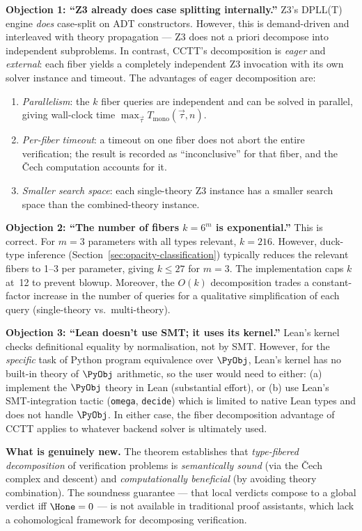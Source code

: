 \begin{remark}
\label{rem:adv-fiber}
\textbf{Objection 1: ``Z3 already does case splitting internally.''}
Z3's DPLL(T) engine \emph{does} case-split on ADT constructors.
However, this is demand-driven and interleaved with theory propagation
— Z3 does not a priori decompose into independent subproblems.  In
contrast, CCTT's decomposition is \emph{eager} and \emph{external}:
each fiber yields a completely independent Z3 invocation with its
own solver instance and timeout.  The advantages of eager
decomposition are:
\begin{enumerate}[label=(\roman*)]
  \item \emph{Parallelism}: the $k$ fiber queries are independent
    and can be solved in parallel, giving wall-clock time
    $\max_{\vec{\tau}} T_{\mathrm{mono}}(\vec{\tau}, n)$.
  \item \emph{Per-fiber timeout}: a timeout on one fiber does not
    abort the entire verification; the result is recorded as
    ``inconclusive'' for that fiber, and the \v{C}ech computation
    accounts for it.
  \item \emph{Smaller search space}: each single-theory Z3 instance
    has a smaller search space than the combined-theory instance.
\end{enumerate}

\textbf{Objection 2: ``The number of fibers $k = 6^m$ is
exponential.''}  This is correct.  For $m = 3$ parameters with all
types relevant, $k = 216$.  However, duck-type inference
(Section~\ref{sec:opacity-classification}) typically reduces the
relevant fibers to 1--3 per parameter, giving $k \leq 27$ for
$m = 3$.  The implementation caps $k$ at~12 to prevent blowup.
Moreover, the $O(k)$ decomposition trades a constant-factor
increase in the number of queries for a qualitative simplification
of each query (single-theory vs.\ multi-theory).

\textbf{Objection 3: ``Lean doesn't use SMT; it uses its kernel.''}
Lean's kernel checks definitional equality by normalisation, not by
SMT.  However, for the \emph{specific} task of Python program
equivalence over $\PyObj$, Lean's kernel has no built-in theory
of $\PyObj$ arithmetic, so the user would need to either:
(a) implement the $\PyObj$ theory in Lean (substantial effort), or
(b) use Lean's SMT-integration tactic (\texttt{omega}, \texttt{decide})
which is limited to native Lean types and does not handle $\PyObj$.
In either case, the fiber decomposition advantage of CCTT applies
to whatever backend solver is ultimately used.

\textbf{What is genuinely new.}
The theorem establishes that \emph{type-fibered decomposition} of
verification problems is \emph{semantically sound} (via the \v{C}ech
complex and descent) and \emph{computationally beneficial} (by
avoiding theory combination).  The soundness guarantee — that local
verdicts compose to a global verdict iff $\Hone = 0$ — is not
available in traditional proof assistants, which lack a cohomological
framework for decomposing verification.
\end{remark}


